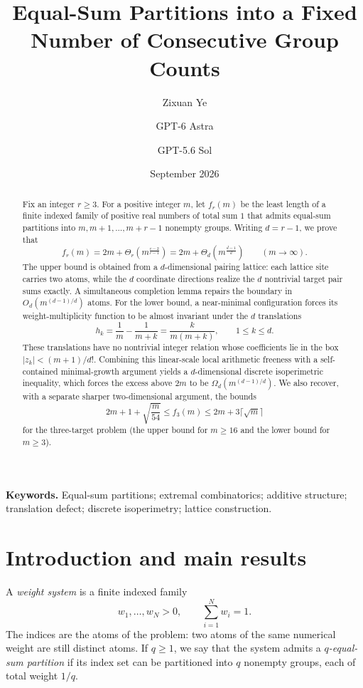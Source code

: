 \documentclass[11pt]{article}
\title{\textbf{Equal-Sum Partitions into a Fixed Number of Consecutive Group Counts}}
\author{Zixuan Ye \and GPT-6 Astra \and GPT-5.6 Sol}
\date{September 2026}
\theoremstyle{definition}
\newcommand{\1}{\mathbf{1}}
\begin{document}
\maketitle

\begin{abstract}
Fix an integer $r\ge 3$.  For a positive integer $m$, let $f_r(m)$ be the least length of a finite indexed family of positive real numbers of total sum $1$ that admits equal-sum partitions into $m,m+1,\ldots,m+r-1$ nonempty groups.  Writing $d=r-1$, we prove that
\[
  f_r(m)=2m+\Theta_r\!\left(m^{\frac{r-2}{r-1}}\right)
  =2m+\Theta_d\!\left(m^{\frac{d-1}{d}}\right)
  \qquad (m\to\infty).
\]
The upper bound is obtained from a $d$-dimensional pairing lattice: each lattice site carries two atoms, while the $d$ coordinate directions realize the $d$ nontrivial target pair sums exactly.  A simultaneous completion lemma repairs the boundary in $O_d(m^{(d-1)/d})$ atoms.  For the lower bound, a near-minimal configuration forces its weight-multiplicity function to be almost invariant under the $d$ translations
\[
  h_k=\frac1m-\frac1{m+k}=\frac{k}{m(m+k)},\qquad 1\le k\le d.
\]
These translations have no nontrivial integer relation whose coefficients lie in the box $|z_k|<(m+1)/d!$.  Combining this linear-scale local arithmetic freeness with a self-contained minimal-growth argument yields a $d$-dimensional discrete isoperimetric inequality, which forces the excess above $2m$ to be $\Omega_d(m^{(d-1)/d})$.  We also recover, with a separate sharper two-dimensional argument, the bounds
\[
  2m+1+\sqrt{\frac{m}{54}}\le f_3(m)\le 2m+3\lceil\sqrt m\rceil
\]
for the three-target problem (the upper bound for $m\ge16$ and the lower bound for $m\ge3$).
\end{abstract}

\medskip
\noindent\textbf{Keywords.} Equal-sum partitions; extremal combinatorics; additive structure; translation defect; discrete isoperimetry; lattice construction.

\section{Introduction and main results}

A \emph{weight system} is a finite indexed family
\[
  w_1,\ldots,w_N>0,\qquad \sum_{i=1}^N w_i=1.
\]
The indices are the atoms of the problem: two atoms of the same numerical weight are still distinct atoms.  If $q\ge1$, we say that the system admits a \emph{$q$-equal-sum partition} if its index set can be partitioned into $q$ nonempty groups, each of total weight $1/q$.
\end{document}
